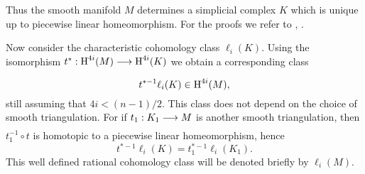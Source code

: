 \documentclass[../main]{subfiles}
\begin{document}
Thus the smooth manifold $M$ determines a simplicial complex $K$ which is unique up to piecewise linear homeomorphism. For the proofs we refer to \cite{whitehead1961}, \cite{munkres2000topology}.

Now consider the characteristic cohomology class $\ell_i(K)$. Using the isomorphism $t^\ast:\homology^{4i}(M) \varrightarrow{} \homology^{4i}(K)$ we obtain a corresponding class \[t^{\ast -1}\ell_i(K) \in \operatorname{H}^{4i}(M),\] still assuming that $4i < (n-1)/2$. This class does not depend on the choice of smooth triangulation. For if $t_1:K_1 \varrightarrow{} M$ is another smooth triangulation, then $t_1^{-1} \circ t$ is homotopic to a piecewise linear homeomorphism, hence \[t^{\ast -1}\ell_i(K) = t_1^{\ast -1}\ell_i(K_1).\] This well defined rational cohomology class will be denoted briefly by $\ell_i(M)$.
\end{document}
